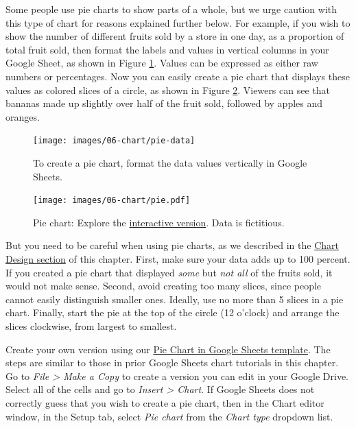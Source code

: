 \documentclass[
  english,
]{book}
\begin{document}
Some people use pie charts to show parts of a whole, but we urge caution with this type of chart for reasons explained further below. For example, if you wish to show the number of different fruits sold by a store in one day, as a proportion of total fruit sold, then format the labels and values in vertical columns in your Google Sheet, as shown in Figure \ref{fig:pie-data}. Values can be expressed as either raw numbers or percentages. Now you can easily create a pie chart that displays these values as colored slices of a circle, as shown in Figure \ref{fig:pie}. Viewers can see that bananas made up slightly over half of the fruit sold, followed by apples and oranges.



\begin{figure}
\texttt{[image: images/06-chart/pie-data]} \caption{To create a pie chart, format the data values vertically in Google Sheets.}\label{fig:pie-data}
\end{figure}



\begin{figure}
\centering
\texttt{[image: images/06-chart/pie.pdf]}
\caption{\label{fig:pie}Pie chart: Explore the \href{https://docs.google.com/spreadsheets/d/e/2PACX-1vQai8YWkqMOHsiwWXpe1jyhBKy5wW6zcMaEIklkF-598h1QaVBrRR0F9JVrsX2Zo5ihXWP-HlnY-KlE/pubchart?oid=760990456\&format=interactive}{interactive version}. Data is fictitious.}
\end{figure}

But you need to be careful when using pie charts, as we described in the \href{chart-design.html}{Chart Design section} of this chapter. First, make sure your data adds up to 100 percent. If you created a pie chart that displayed \emph{some} but \emph{not all} of the fruits sold, it would not make sense. Second, avoid creating too many slices, since people cannot easily distinguish smaller ones. Ideally, use no more than 5 slices in a pie chart. Finally, start the pie at the top of the circle (12 o'clock) and arrange the slices clockwise, from largest to smallest.

Create your own version using our \href{https://docs.google.com/spreadsheets/d/11cn0eysXqXIwhcTKmGuzMDw_RmpDpYLKZN3TeevT-Vg/}{Pie Chart in Google Sheets template}. The steps are similar to those in prior Google Sheets chart tutorials in this chapter. Go to \emph{File \textgreater{} Make a Copy} to create a version you can edit in your Google Drive. Select all of the cells and go to \emph{Insert \textgreater{} Chart}. If Google Sheets does not correctly guess that you wish to create a pie chart, then in the Chart editor window, in the Setup tab, select \emph{Pie chart} from the \emph{Chart type} dropdown list.
\end{document}
